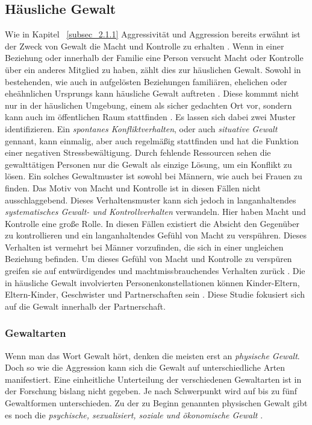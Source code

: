 \subsection{Häusliche Gewalt}    \label{subsec_2.1.2}
Wie in Kapitel ~\ref{subsec_2.1.1} Aggressivität und Aggression bereits erwähnt ist der Zweck von Gewalt die Macht und Kontrolle zu erhalten \parencite{Def_Aggressivität_vs_violence}. Wenn in einer Beziehung oder innerhalb der Familie eine Person versucht Macht oder Kontrolle über ein anderes Mitglied zu haben, zählt dies zur häuslichen Gewalt. Sowohl in bestehenden, wie auch in aufgelösten Beziehungen familiären, ehelichen oder eheähnlichen Ursprungs kann häusliche Gewalt auftreten \parencite{Def_haus_Gewalt, Def_haus_Gewalt_2}. Diese kommmt nicht nur in der häuslichen Umgebung, einem als sicher gedachten Ort vor, sondern kann auch im öffentlichen Raum stattfinden \parencite{Gewaltarten_WHO}. 
Es lassen sich dabei zwei Muster identifizieren. Ein \textit{spontanes Konfliktverhalten}, oder auch \textit{situative Gewalt} gennant, kann einmalig, aber auch regelmäßig stattfinden und hat die Funktion einer negativen Stressbewältigung. Durch fehlende Ressourcen sehen die gewalttätigen Personen nur die Gewalt als einzige Lösung, um ein Konflikt zu lösen. Ein solches Gewaltmuster ist sowohl bei Männern, wie auch bei Frauen zu finden. Das Motiv von Macht und Kontrolle ist in diesen Fällen nicht ausschlaggebend. Dieses Verhaltensmuster kann sich jedoch in langanhaltendes \textit{systematisches Gewalt- und Kontrollverhalten} verwandeln. Hier haben Macht und Kontrolle eine große Rolle. In diesen Fällen existiert die Absicht den Gegenüber zu kontrollieren und ein langanhaltendes Gefühl von Macht zu verspühren. Dieses Verhalten ist vermehrt bei Männer vorzufinden, die sich in einer ungleichen Beziehung befinden. Um dieses Gefühl von Macht und Kontrolle zu verspüren greifen sie auf entwürdigendes und machtmissbrauchendes Verhalten zurück \parencite{Def_Form_Folge_Gewalt}.
Die in häusliche Gewalt involvierten Personenkonstellationen können Kinder-Eltern, Eltern-Kinder, Geschwister und Partnerschaften sein \parencite{Def_Form_Folge_Gewalt}. Diese Studie fokusiert sich auf die Gewalt innerhalb der Partnerschaft.


\subsubsection{Gewaltarten}     \label{2.1.2.1}
Wenn man das Wort Gewalt hört, denken die meisten erst an \textit{physische Gewalt}. Doch so wie die Aggression kann sich die Gewalt auf unterschiedliche Arten manifestiert. Eine einheitliche Unterteilung der verschiedenen Gewaltarten ist in der Forschung bislang nicht gegeben. Je nach Schwerpunkt wird auf bis zu fünf Gewaltformen unterschieden. Zu der zu Beginn genannten physischen Gewalt gibt es noch die \textit{psychische, sexualisiert, soziale und ökonomische Gewalt} \parencite{Def_Form_Folge_Gewalt}.

